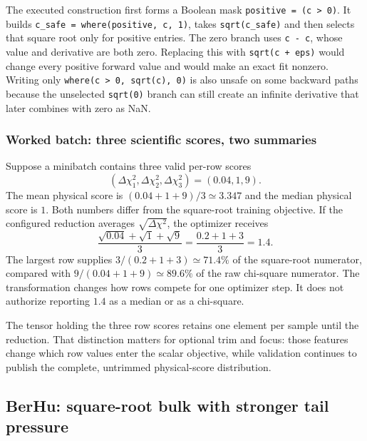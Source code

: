 \documentclass[10pt,aps,prd,twocolumn,nofootinbib]{revtex4-2}
\newcommand{\code}[1]{\texttt{#1}}
\begin{document}
The executed construction first forms a Boolean mask
\code{positive = (c > 0)}.  It builds
\code{c\_safe = where(positive, c, 1)}, takes
\code{sqrt(c\_safe)} and then selects that square root only for positive
entries.  The zero branch uses \code{c - c}, whose value and derivative are
both zero.  Replacing this with \code{sqrt(c + eps)} would change every
positive forward value and would make an exact fit nonzero.  Writing only
\code{where(c > 0, sqrt(c), 0)} is also unsafe on some backward paths because
the unselected \code{sqrt(0)} branch can still create an infinite derivative
that later combines with zero as NaN.

\subsubsection{Worked batch: three scientific scores, two summaries}

Suppose a minibatch contains three valid per-row scores
\begin{equation*}
  (\Delta\chi_1^2,\Delta\chi_2^2,\Delta\chi_3^2)
  =(0.04,1,9).
\end{equation*}
The mean physical score is $(0.04+1+9)/3\simeq3.347$ and the median physical
score is $1$.  Both numbers differ from the square-root training objective.  If the
configured reduction averages $\sqrt{\Delta\chi^2}$, the optimizer receives
\begin{equation*}
  \frac{\sqrt{0.04}+\sqrt{1}+\sqrt{9}}{3}
  =\frac{0.2+1+3}{3}=1.4.
\end{equation*}
The largest row supplies $3/(0.2+1+3)\simeq71.4\%$ of the square-root
numerator, compared with $9/(0.04+1+9)\simeq89.6\%$ of the raw chi-square
numerator.  The
transformation changes how rows compete for one optimizer step.  It does not
authorize reporting $1.4$ as a median or as a chi-square.

The tensor holding the three row scores retains one element per sample until
the reduction.  That distinction matters for optional trim and focus: those
features change which row values enter the scalar objective, while validation
continues to publish the complete, untrimmed physical-score distribution.

\subsection{BerHu: square-root bulk with stronger tail pressure}
\end{document}
